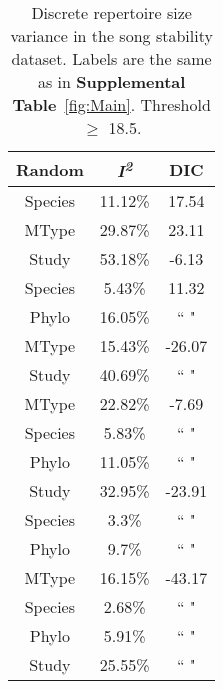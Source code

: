 \documentclass{article}
\begin{document}
  \begin{table}[H]
  \centering
  \caption{Discrete repertoire size variance in the song stability dataset. Labels are the same as in \textbf{Supplemental Table}~\ref{fig:Main}. Threshold $\ge$ 18.5.} 
  \begin{tabular}{ccc}
  \hline
  Random & \textit{I\textsuperscript{2}} & DIC \\ 
  \hline
  Species & 11.12\% & 17.54 \\ \hdashline
  MType & 29.87\% & 23.11 \\ \hdashline
  Study & 53.18\% & -6.13 \\ \hdashline
  Species & 5.43\% & 11.32 \\ 
  Phylo & 16.05\% & `` " \\ \hdashline
  MType & 15.43\% & -26.07 \\ 
  Study & 40.69\% & `` " \\ \hdashline
  MType & 22.82\% & -7.69 \\ 
  Species & 5.83\% & `` " \\ 
  Phylo & 11.05\% & `` " \\ \hdashline
  Study & 32.95\% & -23.91 \\ 
  Species & 3.3\% & `` " \\ 
  Phylo & 9.7\% & `` " \\ \hdashline
  MType & 16.15\% & -43.17 \\ 
  Species & 2.68\% & `` " \\ 
  Phylo & 5.91\% & `` " \\ 
  Study & 25.55\% & `` " \\ 
  \hline
  \end{tabular}
  \end{table}
\end{document}
